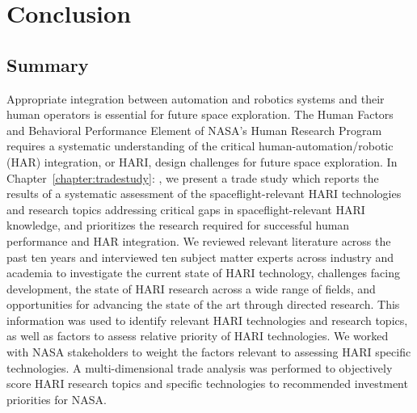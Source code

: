 \chapter{Conclusion}
\label{chap:conclusion}

\section{Summary}

Appropriate integration between automation and robotics systems and their human operators is essential for future space exploration.
The Human Factors and Behavioral Performance Element of NASA's Human Research Program requires a systematic understanding of the critical human-automation/robotic (HAR) integration, or HARI, design challenges for future space exploration.
In Chapter~\ref{chapter:tradestudy}: , we present a trade study which reports the results of a systematic assessment of the spaceflight-relevant HARI technologies and research topics addressing critical gaps in spaceflight-relevant HARI knowledge, and prioritizes the research required for successful human performance and HAR integration.
We reviewed relevant literature across the past ten years and interviewed ten subject matter experts across industry and academia to investigate the current state of HARI technology, challenges facing development, the state of HARI research across a wide range of fields, and opportunities for advancing the state of the art through directed research.
This information was used to identify relevant HARI technologies and research topics, as well as factors to assess relative priority of HARI technologies.
We worked with NASA stakeholders to weight the factors relevant to assessing HARI specific technologies.
A multi-dimensional trade analysis was performed to objectively score HARI research topics and specific technologies to recommended investment priorities for NASA.

